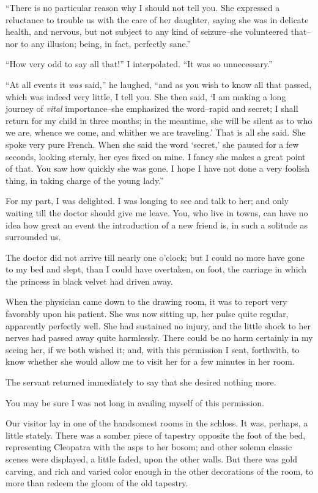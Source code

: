 \documentclass[11pt,twoside,makeidx,hidelinks,]{memoir}
\begin{document}
``There is no particular reason why I should not tell you. She expressed
a reluctance to trouble us with the care of her daughter, saying she was
in delicate health, and nervous, but not subject to any kind of
seizure--she volunteered that--nor to any illusion; being, in fact,
perfectly sane.''

``How very odd to say all that!'' I interpolated. ``It was so unnecessary.''

``At all events it \emph{was} said,'' he laughed, ``and as you wish to know all
that passed, which was indeed very little, I tell you. She then said, `I
am making a long journey of \emph{vital} importance--she emphasized the
word--rapid and secret; I shall return for my child in three months; in
the meantime, she will be silent as to who we are, whence we come, and
whither we are traveling.' That is all she said. She spoke very pure
French. When she said the word `secret,' she paused for a few seconds,
looking sternly, her eyes fixed on mine. I fancy she makes a great point
of that. You saw how quickly she was gone. I hope I have not done a very
foolish thing, in taking charge of the young lady.''

For my part, I was delighted. I was longing to see and talk to her; and
only waiting till the doctor should give me leave. You, who live in
towns, can have no idea how great an event the introduction of a new
friend is, in such a solitude as surrounded us.

The doctor did not arrive till nearly one o'clock; but I could no more
have gone to my bed and slept, than I could have overtaken, on foot, the
carriage in which the princess in black velvet had driven away.

When the physician came down to the drawing room, it was to report very
favorably upon his patient. She was now sitting up, her pulse quite
regular, apparently perfectly well. She had sustained no injury, and the
little shock to her nerves had passed away quite harmlessly. There could
be no harm certainly in my seeing her, if we both wished it; and, with
this permission I sent, forthwith, to know whether she would allow me to
visit her for a few minutes in her room.

The servant returned immediately to say that she desired nothing more.

You may be sure I was not long in availing myself of this permission.

Our visitor lay in one of the handsomest rooms in the schloss. It was,
perhaps, a little stately. There was a somber piece of tapestry opposite
the foot of the bed, representing Cleopatra with the asps to her bosom;
and other solemn classic scenes were displayed, a little faded, upon the
other walls. But there was gold carving, and rich and varied color
enough in the other decorations of the room, to more than redeem the
gloom of the old tapestry.
\end{document}
